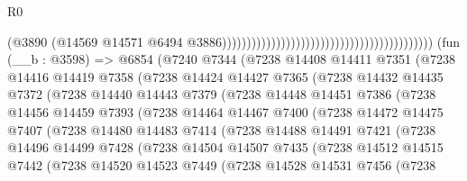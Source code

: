 \begin{lexlean}{R0}
\begin{coremodule}
                                                                                      (@3890
                                                                                        (@14569
                                                                                          @14571
                                                                                          @6494
                                                                                          @3886)))))))))))))))))))))))))))))))))))))))))))
    (fun (__b : @3598) =>
    @6854
      (@7240
        @7344
        (@7238
          @14408
          @14411
          @7351
          (@7238
            @14416
            @14419
            @7358
            (@7238
              @14424
              @14427
              @7365
              (@7238
                @14432
                @14435
                @7372
                (@7238
                  @14440
                  @14443
                  @7379
                  (@7238
                    @14448
                    @14451
                    @7386
                    (@7238
                      @14456
                      @14459
                      @7393
                      (@7238
                        @14464
                        @14467
                        @7400
                        (@7238
                          @14472
                          @14475
                          @7407
                          (@7238
                            @14480
                            @14483
                            @7414
                            (@7238
                              @14488
                              @14491
                              @7421
                              (@7238
                                @14496
                                @14499
                                @7428
                                (@7238
                                  @14504
                                  @14507
                                  @7435
                                  (@7238
                                    @14512
                                    @14515
                                    @7442
                                    (@7238
                                      @14520
                                      @14523
                                      @7449
                                      (@7238
                                        @14528
                                        @14531
                                        @7456
                                        (@7238

\end{coremodule}
\end{lexlean}
